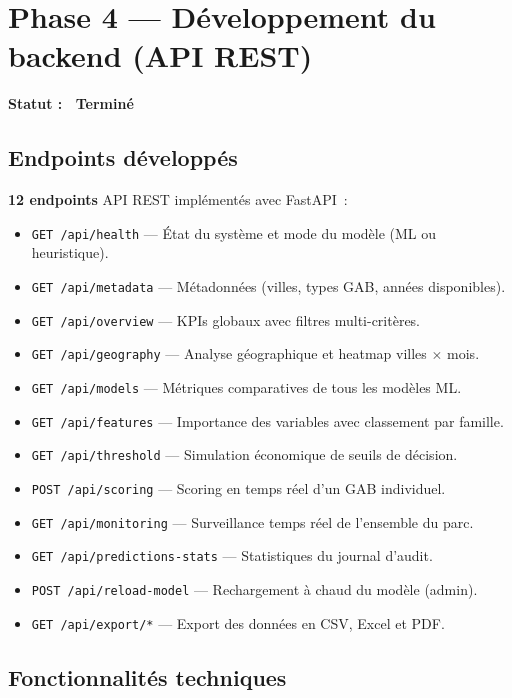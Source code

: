 \documentclass[a4paper,12pt]{report}
\newcommand{\done}{\textcolor{done}{\checkmark\ Terminé}}
\begin{document}
\section{Phase 4 — Développement du backend (API REST)}

\textbf{Statut : \done}

\subsection{Endpoints développés}

\textbf{12 endpoints} API REST implémentés avec FastAPI~:

\begin{itemize}
    \item \texttt{GET /api/health} — État du système et mode du modèle (ML ou heuristique).
    \item \texttt{GET /api/metadata} — Métadonnées (villes, types GAB, années disponibles).
    \item \texttt{GET /api/overview} — KPIs globaux avec filtres multi-critères.
    \item \texttt{GET /api/geography} — Analyse géographique et heatmap villes $\times$ mois.
    \item \texttt{GET /api/models} — Métriques comparatives de tous les modèles ML.
    \item \texttt{GET /api/features} — Importance des variables avec classement par famille.
    \item \texttt{GET /api/threshold} — Simulation économique de seuils de décision.
    \item \texttt{POST /api/scoring} — Scoring en temps réel d'un GAB individuel.
    \item \texttt{GET /api/monitoring} — Surveillance temps réel de l'ensemble du parc.
    \item \texttt{GET /api/predictions-stats} — Statistiques du journal d'audit.
    \item \texttt{POST /api/reload-model} — Rechargement à chaud du modèle (admin).
    \item \texttt{GET /api/export/*} — Export des données en CSV, Excel et PDF.
\end{itemize}

\subsection{Fonctionnalités techniques}
\end{document}
